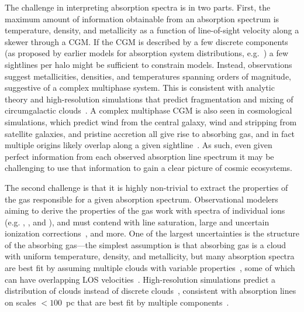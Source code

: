 \documentclass[fleqn,usenatbib]{mnras}
\newcommand{\todo}[1]{\textcolor{Maroon}{\textbf{Address: #1}}}
\begin{document}
The challenge in interpreting absorption spectra is in two parts.
First, the maximum amount of information obtainable from an absorption spectrum is temperature, density, and metallicity as a function of line-of-sight velocity along a skewer through a CGM.
If the CGM is described by a few discrete components (as proposed by earlier models for absorption system distributions, e.g.~\citealt{Srianand1994, Das2001, Maller2003}) a few sightlines per halo might be sufficient to constrain models.
Instead, observations suggest metallicities, densities, and temperatures spanning orders of magnitude, suggestive of a complex multiphase system.
This is consistent with analytic theory and high-resolution simulations that predict fragmentation and mixing of circumgalactic clouds~\citep[e.g.][\todo{There's ton's of work on this, let's expand these references.}]{Maller2004}.
A complex multiphase CGM is also seen in cosmological simulations, which predict wind from the central galaxy, wind and stripping from satellite galaxies, and pristine accretion all give rise to absorbing gas, and in fact multiple origins likely overlap along a given sightline~\citep[e.g.][]{Hafen2019, Hafen2020}.
As such, even given perfect information from each observed absorption line spectrum it may be challenging to use that information to gain a clear picture of cosmic ecosystems.

The second challenge is that it is highly non-trivial to extract the properties of the gas responsible for a given absorption spectrum.
Observational modelers aiming to derive the properties of the gas work with spectra of individual ions (e.g. , , and ), and must contend with line saturation, large and uncertain ionization corrections~\citep[e.g.][]{Schaye2006, Acharya2021}, and more.
One of the largest uncertainties is the structure of the absorbing gas---the simplest assumption is that absorbing gas is a cloud with uniform temperature, density, and metallicity, but many absorption spectra are best fit by assuming multiple clouds with variable properties~\citep[e.g.][]{Boksenberg1979, Muzahid2015, Liang2017, Liang2018, Haislmaier2021, sameer2021.cloudbycloud.bayesian.absorption.system.modeling, zahedy2021.CUBS.III.zle1.LLSs, marra2021.cosmo.sims.test.observational.modeling, narayanan2021.a.multiphase.pLLS, nielsen2022.a.multiphase.DLA}, some of which can have overlapping LOS velocities~\citep[e.g.][]{Marra2022}.
High-resolution simulations predict a distribution of clouds instead of discrete clouds~\citep[e.g.][]{Fielding2020, Vijayan2021}, consistent with absorption lines on scales $<100$~pc that are best fit by multiple components~\citep[e.g.][]{Welsh2010}.
\end{document}
